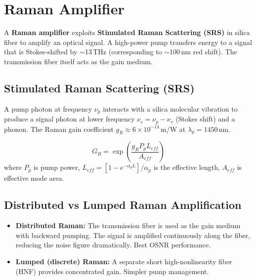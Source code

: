 \documentclass[12pt,a4paper]{article}
\begin{document}
\section{Raman Amplifier}

\begin{tcolorbox}[defbox, title={\textbf{Raman Amplifier}}]
A \textbf{Raman amplifier} exploits \textbf{Stimulated Raman Scattering (SRS)} in silica fiber to amplify an optical signal. A high-power pump transfers energy to a signal that is Stokes-shifted by $\sim$13\,THz (corresponding to $\sim$100\,nm red shift). The transmission fiber itself acts as the gain medium.
\end{tcolorbox}

\subsection{Stimulated Raman Scattering (SRS)}
A pump photon at frequency $\nu_p$ interacts with a silica molecular vibration to produce a signal photon at lower frequency $\nu_s = \nu_p - \nu_v$ (Stokes shift) and a phonon. The Raman gain coefficient $g_R \approx 6\times10^{-14}$\,m/W at $\lambda_p = 1450$\,nm.

\begin{tcolorbox}[formulabox, title={\textbf{Raman Gain}}]
\[
G_R = \exp\!\left(\frac{g_R P_p L_{eff}}{A_{eff}}\right)
\]
where $P_p$ is pump power, $L_{eff} = [1 - e^{-\alpha_p L}]/\alpha_p$ is the effective length, $A_{eff}$ is effective mode area.
\end{tcolorbox}

\subsection{Distributed vs Lumped Raman Amplification}
\begin{itemize}[leftmargin=*, itemsep=3pt]
  \item \textbf{Distributed Raman:} The transmission fiber is used as the gain medium with backward pumping. The signal is amplified continuously along the fiber, reducing the noise figure dramatically. Best OSNR performance.
  \item \textbf{Lumped (discrete) Raman:} A separate short high-nonlinearity fiber (HNF) provides concentrated gain. Simpler pump management.
\end{itemize}
\end{document}
